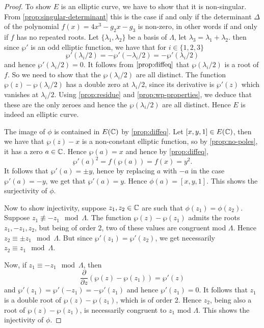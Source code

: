 \begin{proof}
	To show $E$ is an elliptic curve, we have to show that it is non-singular.	
	From \ref{prop:singular-determinant} this is the case if and only if
	the determinant $\Delta$ of the polynomial $f(x) = 4x^3 - g_2x - g_3$
	is non-zero, in other words if and only if $f$ has no repeated roots. 
	Let $\{\lambda_1, \lambda_2\}$ be a basis of $\Lambda$,
	let $\lambda_3 = \lambda_1 + \lambda_2$. then since $\wp'$ is
	an odd elliptic function, we have that for $i \in \{1, 2, 3\}$
	\begin{equation*}
		\wp'(\lambda_i/2) = -\wp'(-\lambda_i/2) = -\wp'(\lambda_i/2)
	\end{equation*}
	and hence $\wp'(\lambda_i/2) = 0$. It follows from $\ref{prop:diffeq}$
	that $\wp(\lambda_i/2)$ is a root of $f$. So we need to show that the
	$\wp(\lambda_i/2)$ are all distinct.
	The function $\wp(z) - \wp(\lambda_i/2)$ has a double zero at $\lambda_i/2$,
	since its derivative is $\wp'(z)$ which vanishes at $\lambda_i/2$.
	Using \ref{prop:residue} and \ref{prop:wp-properties}, we deduce that these
	are the only zeroes and hence the $\wp(\lambda_i/2)$ are all distinct.
	Hence $E$ is indeed an elliptic curve.

	The image of $\phi$ is contained in $E(\mathbb{C})$ by \ref{prop:diffeq}.
	Let $[x, y, 1] \in E(\mathbb{C})$, then we have that $\wp(z) - x$ is a non-constant
	elliptic function, so by \ref{prop:no-poles}, it has a zero $a \in \mathbb{C}$.
	Hence $\wp(a) = x$ and hence by \ref{prop:diffeq}, 
	\begin{equation*}
		\wp'(a)^2 = f(\wp(a)) = f(x) = y^2.
	\end{equation*}
	It follows that $\wp'(a) = \pm y$, hence by replacing $a$ with $-a$ in
	the case $\wp'(a) =-y$, we get that $\wp'(a) = y$.
	Hence $\phi(a) = [x, y, 1]$. This shows the surjectivity of $\phi$.

	Now to show injectivity, suppose $z_1, z_2 \in \mathbb{C}$ are such that
	$\phi(z_1) = \phi(z_2)$. Suppose $z_1 \not\equiv -z_1 \mod \Lambda$.
	The function $\wp(z) - \wp(z_1)$ admits the roots $z_1, -z_1, z_2$, but being
	of order 2, two of these values are congruent mod $\Lambda$.
	Hence $z_2 \equiv \pm z_1 \mod \Lambda$. But since
	$\wp'(z_1) = \wp'(z_2)$, we get necessarily $z_2 \equiv z_1 \mod \Lambda$.
	
	Now, if $z_1 \equiv -z_1 \mod \Lambda$, then
	\begin{equation*}
		\frac{\partial}{\partial z}(\wp(z) - \wp(z_1)) = \wp'(z)
	\end{equation*}
	and $\wp'(z_1) = \wp'(-z_1) = -\wp'(z_1)$ and hence $\wp'(z_1) = 0$.
	It follows that $z_1$ is a double root of $\wp(z) - \wp(z_1)$, which is of
	order 2. Hence $z_2$, being also a root of $\wp(z) - \wp(z_1)$, is
	necessarily congruent to $z_1$ mod $\Lambda$. This shows the injectivity
	of $\phi$.


\end{proof}
